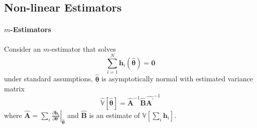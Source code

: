 \documentclass[twoside]{article}
\begin{document}
\subsection{Non-linear Estimators}
\paragraph*{$m$-Estimators}
Consider an $m$-estimator that solves
$$
\sum^N_{i=1}\mathbf{h}_i\left(\hat{\boldsymbol{\theta}}\right) = \mathbf{0}
$$
under standard assumptions, $\hat{\boldsymbol{\theta}}$ is asymptotically normal with estimated variance matrix 
\begin{equation}\label{eq:m-est_varmat}
    \hat{\mathbb{V}}\left[\hat{\boldsymbol{\theta}}\right] = \hat{\mathbf{A}}^{-1}\hat{\mathbf{B}}{\hat{\mathbf{A}^{\prime}}^{-1}}
\end{equation}
where $\hat{\mathbf{A}} = \sum_i \left. \frac{\partial \mathbf{h}_i}{\partial \boldsymbol{\theta}'}\right\vert _{\hat{\boldsymbol{\theta}}}$ and $\hat{\mathbf{B}}$ is an estimate of $\mathbb{V}\left[\sum_i\mathbf{h}_i\right]$.
\end{document}

